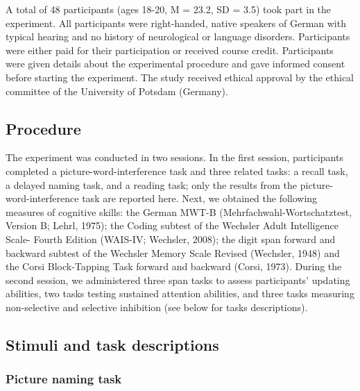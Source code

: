 \documentclass[
  man,floatsintext]{apa6}
\begin{document}
A total of 48 participants (ages 18-20, M = 23.2, SD = 3.5) took part in the experiment. All participants were right-handed, native speakers of German with typical hearing and no history of neurological or language disorders. Participants were either paid for their participation or received course credit. Participants were given details about the experimental procedure and gave informed consent before starting the experiment. The study received ethical approval by the ethical committee of the University of Potsdam (Germany).

\hypertarget{procedure-1}{%
\subsection{Procedure}\label{procedure-1}}

The experiment was conducted in two sessions. In the first session, participants completed a picture-word-interference task and three related tasks: a recall task, a delayed naming task, and a reading task; only the results from the picture-word-interference task are reported here. Next, we obtained the following measures of cognitive skills: the German MWT-B (Mehrfachwahl-Wortschatztest, Version B; Lehrl, 1975); the Coding subtest of the Wechsler Adult Intelligence Scale- Fourth Edition (WAIS-IV; Wechsler, 2008); the digit span forward and backward subtest of the Wechsler Memory Scale Revised (Wechsler, 1948) and the Corsi Block-Tapping Task forward and backward (Corsi, 1973). During the second session, we administered three span tasks to assess participants' updating abilities, two tasks testing sustained attention abilities, and three tasks measuring non-selective and selective inhibition (see below for tasks descriptions).

\hypertarget{stimuli-and-task-descriptions-1}{%
\subsection{Stimuli and task descriptions}\label{stimuli-and-task-descriptions-1}}

\hypertarget{picture-naming-task-1}{%
\subsubsection{Picture naming task}\label{picture-naming-task-1}}
\end{document}
